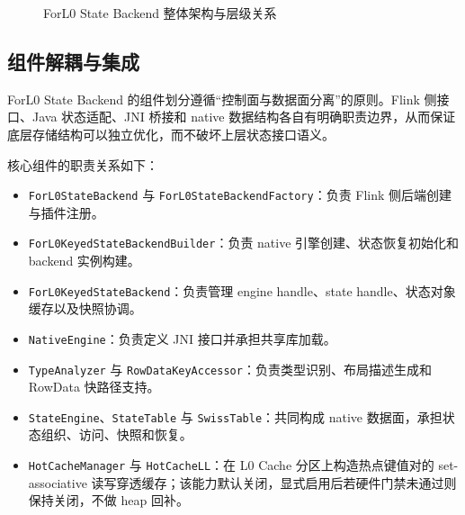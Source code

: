 \documentclass[a4paper,11pt]{article}
\newcommand{\project}{ForL0 State Backend}
\begin{document}
\begin{figure}[htbp]
\caption{\project{} 整体架构与层级关系}
\label{fig:overall}
\end{figure}

\subsection{组件解耦与集成}

\project{} 的组件划分遵循“控制面与数据面分离”的原则。Flink 侧接口、Java 状态适配、JNI 桥接和 native 数据结构各自有明确职责边界，从而保证底层存储结构可以独立优化，而不破坏上层状态接口语义。

核心组件的职责关系如下：

\begin{itemize}
  \item \texttt{ForL0StateBackend} 与 \texttt{ForL0StateBackendFactory}：负责 Flink 侧后端创建与插件注册。
  \item \texttt{ForL0KeyedStateBackendBuilder}：负责 native 引擎创建、状态恢复初始化和 backend 实例构建。
  \item \texttt{ForL0KeyedStateBackend}：负责管理 engine handle、state handle、状态对象缓存以及快照协调。
  \item \texttt{NativeEngine}：负责定义 JNI 接口并承担共享库加载。
  \item \texttt{TypeAnalyzer} 与 \texttt{RowDataKeyAccessor}：负责类型识别、布局描述生成和 RowData 快路径支持。
  \item \texttt{StateEngine}、\texttt{StateTable} 与 \texttt{SwissTable}：共同构成 native 数据面，承担状态组织、访问、快照和恢复。
  \item \texttt{HotCacheManager} 与 \texttt{HotCacheLL}：在 L0 Cache 分区上构造热点键值对的 set-associative 读写穿透缓存；该能力默认关闭，显式启用后若硬件门禁未通过则保持关闭，不做 heap 回补。
\end{itemize}
\end{document}
